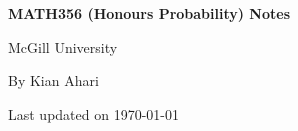 \documentclass[12pt, letterpaper]{article}
\theoremstyle{definition}
\theoremstyle{remark}
\renewcommand{\bold}[1]{\textbf{#1}}
\begin{document}
\begin{titlepage}
	\begin{titlepage}
		\begin{flushright}
			\LARGE
			\bold{MATH356 (Honours Probability) Notes}
			
			\vspace{0.5cm}
			\large
			McGill University
			\vspace{0.5 cm}

			By Kian Ahari
			\vspace{0.5 cm}
			
			Last updated on \today
			\vfill
		\end{flushright}
	\end{titlepage}
\end{titlepage}
\newpage
\thispagestyle{empty}
\tableofcontents
\newpage




\end{document}
